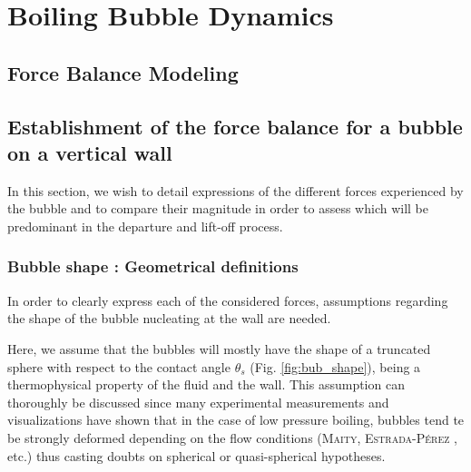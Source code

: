 
\chapter{Boiling Bubble Dynamics} %

\label{ch:name} %




\section{Force Balance Modeling}\label{sec:forces}



\clearpage


\section{Establishment of the force balance for a bubble on a vertical wall }


In this section, we wish to detail expressions of the different forces experienced by the bubble and to compare their magnitude in order to assess which will be predominant in the departure and lift-off process.

\subsection{Bubble shape : Geometrical definitions}

\label{subsec:geom_bub}

In order to clearly express each of the considered forces, assumptions regarding the shape of the bubble nucleating at the wall are needed.

\npar

Here, we assume that the bubbles will mostly have the shape of a truncated sphere with respect to the contact angle $\theta_{s}$ (Fig. \ref{fig:bub_shape}), being a thermophysical property of the fluid and the  wall. This assumption can thoroughly be discussed since many experimental measurements and visualizations have shown that in the case of low pressure boiling, bubbles tend te be strongly deformed depending on the flow conditions (\textsc{Maity}, \textsc{Estrada-Pérez} \etal, etc.) thus casting doubts on spherical or quasi-spherical hypotheses.

